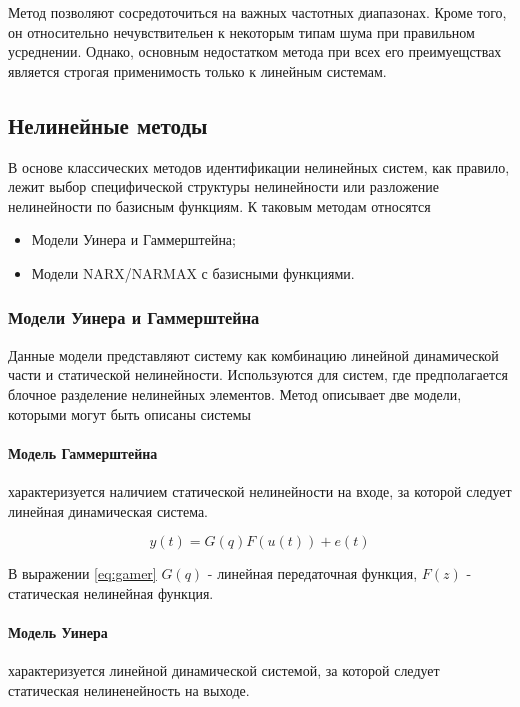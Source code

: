 Метод позволяют сосредоточиться на важных частотных диапазонах. Кроме того, он относительно нечувствительен к некоторым типам шума при правильном усреднении. Однако, основным недостатком метода при всех его преимуещствах является строгая применимость только к линейным системам.

\subsection{Нелинейные методы}

В основе классических методов идентификации нелинейных систем, как правило, лежит выбор специфической структуры нелинейности или разложение нелинейности по базисным функциям. К таковым методам относятся

\begin{itemize}
  \item Модели Уинера и Гаммерштейна;
  \item Модели NARX/NARMAX с базисными функциями.
\end{itemize}

\subsubsection{Модели Уинера и Гаммерштейна}

Данные модели представляют систему как комбинацию линейной динамической части и
статической нелинейности. Используются для систем, где предполагается блочное
разделение нелинейных элементов. Метод описывает две модели, которыми могут
быть описаны системы

\paragraph{Модель Гаммерштейна} характеризуется наличием статической
нелинейности на входе, за которой следует линейная динамическая система.

\begin{equation}
  y(t)=G(q)F(u(t))+e(t)
  \label{eq:gamer}
\end{equation}

В выражении \ref{eq:gamer} $G(q)$ - линейная передаточная функция, $F(z)$ -
статическая нелинейная функция. 

\paragraph{Модель Уинера} характеризуется линейной динамической системой, за которой следует статическая нелиненейность на выходе.

